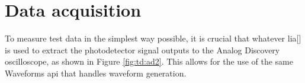 

\section{Data acquisition} \label{chap:td:daq}
To measure test data in the simplest way possible, it is crucial that whatever \gls{lia}[] is used to extract the photodetector signal outputs to the Analog Discovery oscilloscope, as shown in Figure \ref{fig:td:ad2}. This allows for the use of the same Waveforms \gls{api} that handles waveform generation.

